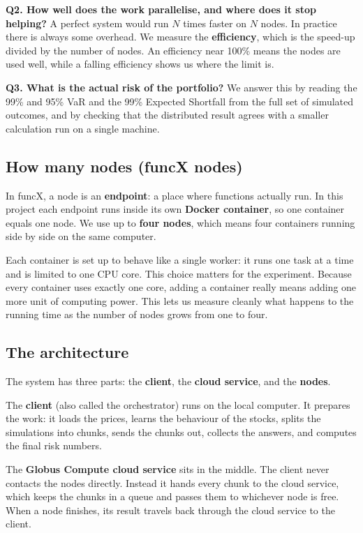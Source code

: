 \documentclass[11pt,a4paper]{article}
\begin{document}
\textbf{Q2. How well does the work parallelise, and where does it stop helping?} A perfect system would run $N$ times faster on $N$ nodes. In practice there is always some overhead. We measure the \textbf{efficiency}, which is the speed-up divided by the number of nodes. An efficiency near 100\% means the nodes are used well, while a falling efficiency shows us where the limit is.

\textbf{Q3. What is the actual risk of the portfolio?} We answer this by reading the 99\% and 95\% VaR and the 99\% Expected Shortfall from the full set of simulated outcomes, and by checking that the distributed result agrees with a smaller calculation run on a single machine.

\subsection{How many nodes (funcX nodes)}

In funcX, a node is an \textbf{endpoint}: a place where functions actually run. In this project each endpoint runs inside its own \textbf{Docker container}, so one container equals one node. We use up to \textbf{four nodes}, which means four containers running side by side on the same computer.

Each container is set up to behave like a single worker: it runs one task at a time and is limited to one CPU core. This choice matters for the experiment. Because every container uses exactly one core, adding a container really means adding one more unit of computing power. This lets us measure cleanly what happens to the running time as the number of nodes grows from one to four.

\subsection{The architecture}

The system has three parts: the \textbf{client}, the \textbf{cloud service}, and the \textbf{nodes}.

The \textbf{client} (also called the orchestrator) runs on the local computer. It prepares the work: it loads the prices, learns the behaviour of the stocks, splits the simulations into chunks, sends the chunks out, collects the answers, and computes the final risk numbers.

The \textbf{Globus Compute cloud service} sits in the middle. The client never contacts the nodes directly. Instead it hands every chunk to the cloud service, which keeps the chunks in a queue and passes them to whichever node is free. When a node finishes, its result travels back through the cloud service to the client.
\end{document}
